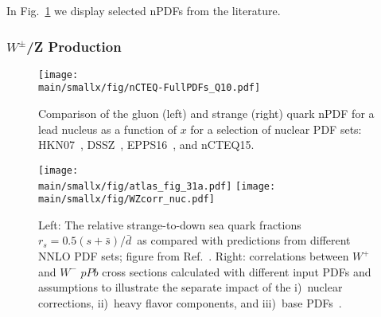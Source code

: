 \documentclass[../report.tex]{subfiles}
\providecommand{\main}{..}
\begin{document}
In Fig.~\ref{fig:npdf} we display selected nPDFs from the literature. 


\subsubsection{$W^\pm$/Z Production}

\begin{figure}[tbh] %
\centering{} 
\texttt{[image: \\main/smallx/fig/nCTEQ-FullPDFs\_Q10.pdf]}
\caption{
Comparison of the gluon (left) and strange (right) quark nPDF for a lead nucleus as a function of $x$ for 
a selection of nuclear PDF sets:
HKN07~\cite{Hirai:2004wq}, DSSZ~\cite{deFlorian:2011fp}, EPPS16~\cite{Eskola:2016oht}, and nCTEQ15\cite{Kovarik:2015cma}.
}
\label{fig:npdf}
\end{figure}


\begin{figure}[t] %
\centering{} 
\texttt{[image: \\main/smallx/fig/atlas\_fig\_31a.pdf]}
\hfil
\texttt{[image: \\main/smallx/fig/WZcorr\_nuc.pdf]}
\caption{
Left: The relative strange-to-down sea quark fractions 
$r_s=0.5(s + \bar{s})/\bar{d}$\  as compared with  predictions from different NNLO PDF sets; figure from Ref.~\cite{Aaboud:2016btc}. 
\quad 
Right: correlations between $W^+$ and $W^-$ $pPb$  cross sections calculated with different input PDFs and assumptions   to illustrate the separate impact of the 
i)~nuclear corrections, ii)~heavy flavor components, and iii)~base PDFs~\cite{Kusina:2016fxy,Godat:2018kgp}.}
\label{fig:WZcorr}
\end{figure}

\end{document}
